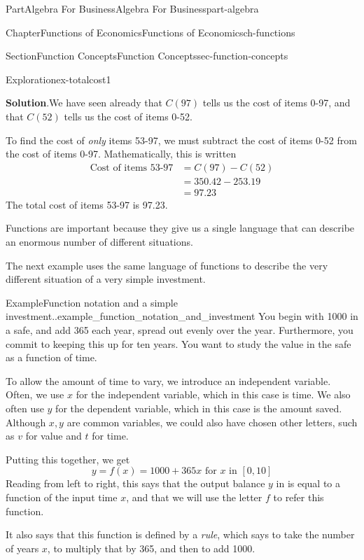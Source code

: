 \documentclass[oneside,10pt,]{tufte-book}
\newcommand{\blocktitlefont}{\relax}
\numberwithin{equation}{chapter}
\newcommand{\amp}{&}
\begin{document}
\begin{partptx}{Part}{Algebra For Business}{}{Algebra For Business}{}{}{part-algebra}
\begin{chapterptx}{Chapter}{Functions of Economics}{}{Functions of Economics}{}{}{ch-functions}
\begin{sectionptx}{Section}{Function Concepts}{}{Function Concepts}{}{}{sec-function-concepts}
\begin{exploration}{Exploration}{}{ex-totalcost1}
\begin{enumerate}[font=\bfseries,label=(\alph*),ref=\alph*]
\noindent\textbf{\blocktitlefont Solution}.\hypertarget{ex-totalcost1-4-2}{}\quad{}We have seen already that \(C(97)\) tells us the cost of items 0-97, and that \(C(52)\) tells us the cost of items 0-52.%
\par
To find the cost of \emph{only} items 53-97, we must subtract the cost of items 0-52 from the cost of items 0-97. Mathematically, this is written%
\begin{align*}
\text{Cost of items 53-97} \amp = C(97) - C(52) \\
\amp = 350.42 - 253.19\\
\amp = 97.23
\end{align*}
The total cost of items 53-97 is \textdollar{}97.23.%
\end{enumerate}%
\end{exploration}%
Functions are important because they give us a single language that can describe an enormous number of different situations.%
\par
The next example uses the same language of functions to describe the very different situation of a very simple investment.%
\begin{example}{Example}{Function notation and a simple investment..}{example_function_notation_and_investment}%
You begin with \textdollar{}1000 in a safe, and add \textdollar{}365 each year, spread out evenly over the year. Furthermore, you commit to keeping this up for ten years. You want to study the value in the safe as a function of time.%
\par
To allow the amount of time to vary, we introduce an independent variable. Often, we use \(x\) for the independent variable, which in this case is time. We also often use \(y\) for the dependent variable, which in this case is the amount saved. Although \(x,y\) are common variables, we could also have chosen other letters, such as \(v\) for value and \(t\) for time.%
\par
Putting this together, we get%
\begin{equation*}
y = f(x) = 1000 + 365 x \text{ for }x\text{ in } [0,10]
\end{equation*}
Reading from left to right, this says that the output balance \(y\) in \textdollar{} is equal to a function of the input time \(x\), and that we will use the letter \(f\) to refer this function.%
\par
It also says that this function is defined by a \emph{rule}, which says to take the number of years \(x\), to multiply that by 365, and then to add \textdollar{}1000.%
\par

\end{example}
\end{sectionptx}
\end{chapterptx}
\end{partptx}
\end{document}
